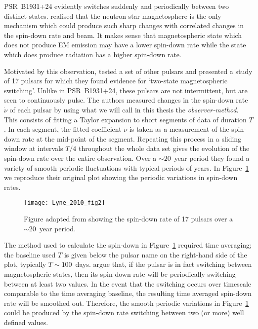 PSR~B1931+24 evidently switches suddenly and periodically between two distinct
states. \citet{Kramer2006} realised that the neutron star
magnetosphere is the only mechanism which could produce such sharp changes with
correlated changes in the spin-down rate and beam.  It makes sense
that magnetospheric state which does not produce EM emission may have a lower
spin-down rate while the state which does produce radiation has a higher
spin-down rate.

Motivated by this observation, \citet{Lyne2010} tested a set
of other pulsars and presented a study of 17 pulsars for which they found
evidence for `two-state magnetospheric switching'. Unlike in PSR~B1931+24,
these pulsars are not intermittent, but are seen to continuously pulse. The
authors measured changes in the spin-down rate $\dot{\nu}$ of each pulsar by
using what we will call in this thesis the \emph{observer-method}. This
consists of fitting a Taylor expansion to short segments of data of duration
$T$. In each segment, the fitted coefficient $\dot{\nu}$ is taken as a
measurement of the spin-down rate at the mid-point of the segment. Repeating
this process in a sliding window at intervals $T/4$ throughout the whole data set gives the
evolution of the spin-down rate over the entire observation.  Over a
$\sim20$~year period they found a variety of smooth periodic fluctuations with
typical periods of years. In Figure~\ref{fig: lyne 2010 fig2} we reproduce their
original plot showing the periodic variations in spin-down rates.
\begin{figure}
    \centering
    \texttt{[image: Lyne\_2010\_fig2]}
    \caption{Figure adapted from \citet{Lyne2010} showing the spin-down rate
             of 17 pulsars over a $\sim20$~year period.}
    \label{fig: lyne 2010 fig2}
\end{figure}

The method used to calculate the spin-down in Figure~\ref{fig: lyne 2010 fig2}
required time averaging; the baseline used $T$ is given below the pulsar name
on the right-hand side of the plot, typically $T\sim100$~days.
\citet{Lyne2010} argue that, if the pulsar is in fact switching between
magnetospheric states, then its spin-down rate will be periodically switching
between at least two values. In the event that the switching occurs over
timescale comparable to the time averaging baseline, the resulting time averaged
spin-down rate will be smoothed out. Therefore, the smooth periodic variations in
Figure~\ref{fig: lyne 2010 fig2} could be produced by the spin-down rate
switching between two (or more) well defined values.

